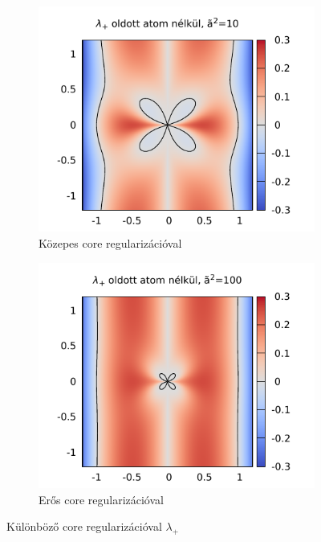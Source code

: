 \documentclass[10pt,a4paper]{scrartcl}
\begin{document}
\begin{figure}[h]
\begin{subfigure}[t]{0.495\linewidth}
\centering\includegraphics[scale=0.95]{"figs/lambda_k_surface_atsq=10"}
\caption{Közepes core regularizációval}
\end{subfigure}
\begin{subfigure}[t]{0.495\linewidth}
\centering\includegraphics[scale=0.95]{"figs/lambda_k_surface_atsq=100"}
\caption{Erős core regularizációval}
\end{subfigure}
\caption{Különböző core regularizációval $\lambda_+$}
\end{figure}
\end{document}
